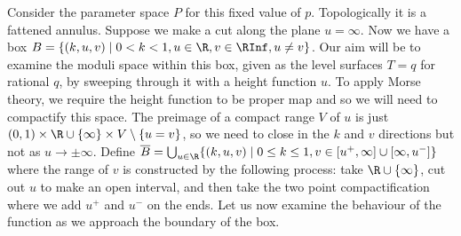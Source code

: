 Consider the parameter space $P$ for this fixed value of $p$. Topologically it is a fattened annulus. Suppose we make a cut along the plane $u=\infty$. Now we have a box $B = \{(k,u,v)\mid 0 < k <1, u \in \R , v \in\RInf, u \neq v\}$. Our aim will be to examine the moduli space within this box, given as the level surfaces $T=q$ for rational $q$, by sweeping through it with a height function $u$. To apply Morse theory, we require the height function to be proper map and so we will need to compactify this space. The preimage of a compact range $V$ of $u$ is just $(0,1)\times \R\cup\{\infty\}\times V \setminus \{u=v\} $, so we need to close in the $k$ and $v$ directions but not as $u\to\pm\infty$. Define $\overline{B} = \bigcup_{u\in\R} \{(k,u,v)\mid 0 \leq k \leq 1, v \in [u^+, \infty] \cup [\infty, u^-] \}$ where the range of $v$ is constructed by the following process: take $\R\cup\{\infty\}$, cut out $u$ to make an open interval, and then take the two point compactification where we add $u^+$ and $u^-$ on the ends. Let us now examine the behaviour of the function as we approach the boundary of the box.


